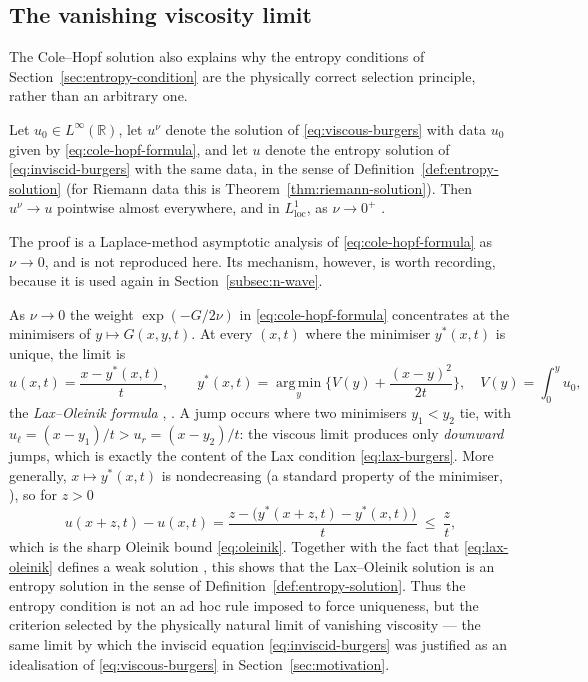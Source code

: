 \subsection{The vanishing viscosity limit}
\label{subsec:vanishing-viscosity}

The Cole--Hopf solution also explains why the entropy conditions of
Section~\ref{sec:entropy-condition} are the physically correct selection
principle, rather than an arbitrary one.

\begin{theorem}
\label{thm:vanishing-viscosity}
Let $u_0\in L^\infty(\mathbb{R})$, let $u^\nu$ denote the solution of
\eqref{eq:viscous-burgers} with data $u_0$ given by
\eqref{eq:cole-hopf-formula}, and let $u$ denote the entropy solution of
\eqref{eq:inviscid-burgers} with the same data, in the sense of
Definition~\ref{def:entropy-solution} (for Riemann data this is
Theorem~\ref{thm:riemann-solution}). Then $u^\nu \to u$ pointwise almost
everywhere, and in $L^1_{\mathrm{loc}}$, as $\nu \to 0^+$ \cite{hopf1950}.
\end{theorem}

The proof is a Laplace-method asymptotic analysis of
\eqref{eq:cole-hopf-formula} as $\nu\to0$, and is not reproduced here. Its
mechanism, however, is worth recording, because it is used again in
Section~\ref{subsec:n-wave}.

\begin{remark}
\label{rem:lax-oleinik}
As $\nu\to0$ the weight $\exp(-G/2\nu)$ in
\eqref{eq:cole-hopf-formula} concentrates at the minimisers of
$y\mapsto G(x,y,t)$. At every $(x,t)$ where the minimiser
$y^*(x,t)$ is unique, the limit is
\begin{equation}
  \label{eq:lax-oleinik}
  u(x,t)=\frac{x-y^*(x,t)}{t},\qquad
  y^*(x,t)=\operatorname*{arg\,min}_y\Big\{V(y)+\frac{(x-y)^2}{2t}\Big\},
  \quad V(y)=\int_0^y u_0 ,
\end{equation}
the \emph{Lax--Oleinik formula} \cite{lax1957,oleinik1957}, \cite[\S3.4.2]{evans2010}. A jump occurs
where two minimisers $y_1<y_2$ tie, with $u_\ell=(x-y_1)/t>u_r=(x-y_2)/t$:
the viscous limit produces only \emph{downward} jumps, which is exactly
the content of the Lax condition \eqref{eq:lax-burgers}. More
generally, $x\mapsto y^*(x,t)$ is nondecreasing (a standard property of the
minimiser, \cite[\S3.4.2]{evans2010}), so for $z>0$
\begin{equation*}
  u(x+z,t)-u(x,t)=\frac{z-\big(y^*(x+z,t)-y^*(x,t)\big)}{t}\ \le\ \frac zt,
\end{equation*}
which is the sharp Oleinik bound \eqref{eq:oleinik}. Together with the fact
that \eqref{eq:lax-oleinik} defines a weak solution
\cite[\S3.4.2]{evans2010}, this shows that the Lax--Oleinik solution is an
entropy solution in the sense of Definition~\ref{def:entropy-solution}. Thus the
entropy condition is not an ad hoc rule imposed to force uniqueness, but
the criterion selected by the physically natural limit of vanishing
viscosity --- the same limit by which the inviscid equation
\eqref{eq:inviscid-burgers} was justified as an idealisation of
\eqref{eq:viscous-burgers} in Section~\ref{sec:motivation}.
\end{remark}

